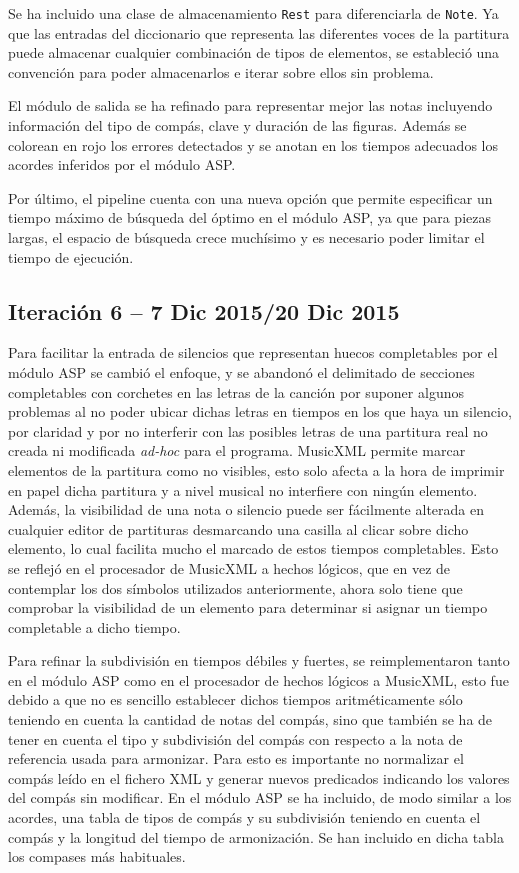 Se ha incluido una clase de almacenamiento \texttt{Rest} para diferenciarla de \texttt{Note}. Ya que las entradas del diccionario que representa las diferentes voces de la partitura puede almacenar cualquier combinación de tipos de elementos, se estableció una convención para poder almacenarlos e iterar sobre ellos sin problema.

El módulo de salida se ha refinado para representar mejor las notas incluyendo información del tipo de compás, clave y duración de las figuras. Además se colorean en rojo los errores detectados y se anotan en los tiempos adecuados los acordes inferidos por el módulo ASP.

Por último, el pipeline cuenta con una nueva opción que permite especificar un tiempo máximo de búsqueda del óptimo en el módulo ASP, ya que para piezas largas, el espacio de búsqueda crece muchísimo y es necesario poder limitar el tiempo de ejecución.

\subsection{Iteración 6  -- 7 Dic 2015/20 Dic 2015}
\label{sec:sixth_iteration}

Para facilitar la entrada de silencios que representan huecos completables por el módulo ASP se cambió el enfoque, y se abandonó el delimitado de secciones completables con corchetes en las letras de la canción por suponer algunos problemas al no poder ubicar dichas letras en tiempos en los que haya un silencio, por claridad y por no interferir con las posibles letras de una partitura real no creada ni modificada \textit{ad-hoc} para el programa. MusicXML permite marcar elementos de la partitura como no visibles, esto solo afecta a la hora de imprimir en papel dicha partitura y a nivel musical no interfiere con ningún elemento. Además, la visibilidad de una nota o silencio puede ser fácilmente alterada en cualquier editor de partituras desmarcando una casilla al clicar sobre dicho elemento, lo cual facilita mucho el marcado de estos tiempos completables. Esto se reflejó en el procesador de MusicXML a hechos lógicos, que en vez de contemplar los dos símbolos utilizados anteriormente, ahora solo tiene que comprobar la visibilidad de un elemento para determinar si asignar un tiempo completable a dicho tiempo.

Para refinar la subdivisión en tiempos débiles y fuertes, se reimplementaron tanto en el módulo ASP como en el procesador de hechos lógicos a MusicXML, esto fue debido a que no es sencillo establecer dichos tiempos aritméticamente sólo teniendo en cuenta la cantidad de notas del compás, sino que también se ha de tener en cuenta el tipo y subdivisión del compás con respecto a la nota de referencia usada para armonizar. Para esto es importante no normalizar el compás leído en el fichero XML y generar nuevos predicados indicando los valores del compás sin modificar. En el módulo ASP se ha incluido, de modo similar a los acordes, una tabla de tipos de compás y su subdivisión teniendo en cuenta el compás y la longitud del tiempo de armonización. Se han incluido en dicha tabla los compases más habituales. 

